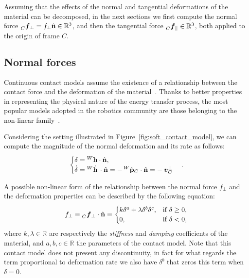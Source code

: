 Assuming that the effects of the normal and tangential deformations of the material can be decomposed, in the next sections we first compute the normal force $\forcelin[C]_\perp = f_\perp \hat{\mathbf{n}} \in \mathbb{R}^3$, and then the tangential force $\forcelin[C]_\parallel \in \mathbb{R}^3$, both applied to the origin of frame $C$.

\subsection{Normal forces}
\label{section:normal_forces}

Continuous contact models assume the existence of a relationship between the contact force and the deformation of the material~\parencite{romualdi_modeling_2021}.
Thanks to better properties in representing the physical nature of the energy transfer process, the most popular models adopted in the robotics community are those belonging to the non-linear family~\citep{azad_model_2016}.

Considering the setting illustrated in Figure~\ref{fig:soft_contact_model}, we can compute the magnitude of the normal deformation and its rate as follows:
%
\begin{equation*}
    \begin{cases}
        \delta = {}^W \mathbf{h} \cdot \hat{\mathbf{n}}, \\
        \dot{\delta} = {}^W \dot{\mathbf{h}} \, \cdot \hat{\mathbf{n}} = -\posd[W]_C \cdot \hat{\mathbf{n}} = -\vellin_C^\perp
    \end{cases}
    .
\end{equation*}

A possible non-linear form of the relationship between the normal force $f_\perp$ and the deformation properties can be described by the following equation:
%
\begin{equation*}
    f_\perp = \forcelin[C]_\perp \cdot \hat{\mathbf{n}} =
    \begin{cases}
        k \delta^a + \lambda \delta^b \dot{\delta}^c ,& \text{if $\delta\geq0$,} \\
        0 ,& \text{if $\delta<0$,}
    \end{cases}
\end{equation*}
%
where $k, \lambda \in \mathbb{R}$ are respectively the \emph{stiffness} and \emph{damping} coefficients of the material, and $a, b, c \in \mathbb{R}$ the parameters of the contact model.
Note that this contact model does not present any discontinuity, in fact for what regards the term proportional to deformation rate we also have $\delta^b$ that zeros this term when $\delta = 0$.

